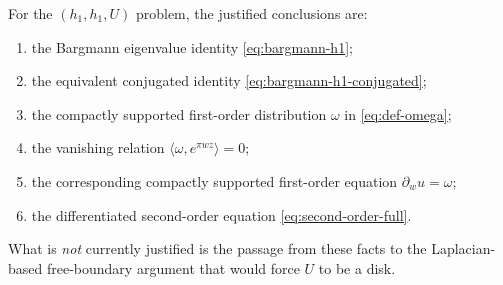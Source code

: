\documentclass[11pt]{article}
\newcommand{\1}{\mathbf 1}
\newcommand{\pw}{\partial_w}
\begin{document}
For the \((h_1,h_1,U)\) problem, the justified conclusions are:
\begin{enumerate}[label=\textnormal{(\arabic*)}]
\item the Bargmann eigenvalue identity \eqref{eq:bargmann-h1};
\item the equivalent conjugated identity \eqref{eq:bargmann-h1-conjugated};
\item the compactly supported first-order distribution \(\omega\) in \eqref{eq:def-omega};
\item the vanishing relation \(\langle \omega,e^{\pi wz}\rangle=0\);
\item the corresponding compactly supported first-order equation \(\pw u=\omega\);
\item the differentiated second-order equation \eqref{eq:second-order-full}.
\end{enumerate}

What is \emph{not} currently justified is the passage from these facts to the Laplacian-based
free-boundary argument that would force \(U\) to be a disk.
\end{document}
